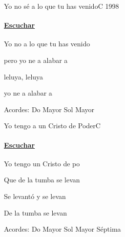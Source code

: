\documentclass[12pt, spanish]{book}
\newcommand{\NotCCLIed}{\relax}
\begin{document}
    \begin{song}{Yo no sé a lo que tu has venido}{C}
        {1998} %
        {}
        {} %
        {} %
        \ifChordBk
            \paragraph{\mbox{}\hfill\protect\href{https://open.spotify.com/intl-es/track/74yZi82LOHLonCpWNReYAh}{Escuchar}\mbox{}\hfill}
        \fi


        \begin{SBOpGroup}
            Yo no  a lo que tu has venido

            pero yo ne a alabar a 

            leluya, leluya

            yo ne a alabar a 
        \end{SBOpGroup}

        \ifChordBk
        \begin{SBOpGroup}
            Acordes:\break
            \upchord{\C}\qquad Do Mayor \hfill
            \upchord{\G}\qquad Sol Mayor \hfill\null\break
        \end{SBOpGroup}
        \fi
    \end{song}

    \begin{song}{Yo tengo a un Cristo de Poder}{C}
        {} %
        {}
        {} %
        {} %
        \ifChordBk
            \paragraph{\mbox{}\hfill\protect\href{https://open.spotify.com/intl-es/track/6pLpL7dqUxo8wf3Ybjtorl}{Escuchar}\mbox{}\hfill}
        \fi

        \begin{SBOpGroup}
            Yo tengo un Cristo de po

            Que de la tumba se levan
        \end{SBOpGroup}

        \begin{SBOpGroup}
            Se levantó y se levan

            De la tumba se levan
        \end{SBOpGroup}

        \ifChordBk
        \begin{SBOpGroup}
            Acordes:\break
            \upchord{\C}\qquad Do Mayor \hfill
            \upchord{\Gseven}\qquad Sol Mayor S\'eptima \hfill\null\break
        \end{SBOpGroup}
        \fi
    \end{song}
\end{document}

